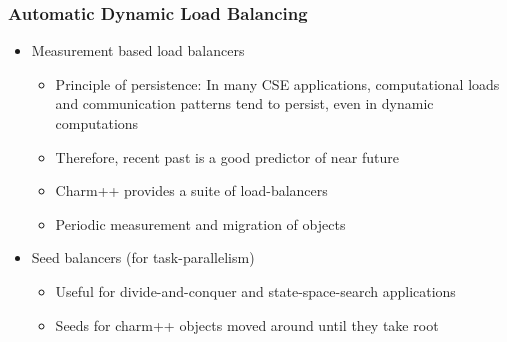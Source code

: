 






\begin{frame}[fragile]
\frametitle{Automatic Dynamic Load Balancing}
\begin{itemize}
\item Measurement based load balancers
\begin{itemize}
\item Principle of persistence: In many CSE applications, computational loads and communication patterns tend to persist, even in dynamic computations
\item Therefore, recent past is a good predictor of near future
\item Charm++ provides a suite of load-balancers 
\item Periodic measurement and migration of objects
\end{itemize}
\item Seed balancers (for task-parallelism)
\begin{itemize}
\item Useful for divide-and-conquer and state-space-search applications
\item Seeds for charm++ objects moved around until they take root
\end{itemize}
\end{itemize}
\end{frame}

